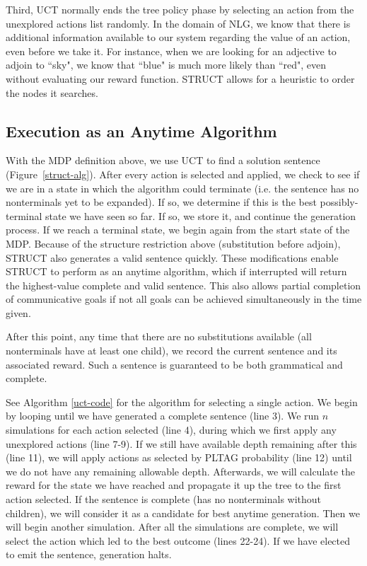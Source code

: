 Third, UCT normally ends the tree policy phase by selecting an action
from the unexplored actions list randomly.  In the domain of NLG,
we know that there is additional information available to our system
regarding the value of an action, even before we take it. For instance,
when we are looking for an adjective to adjoin to ``sky", we know that ``blue" is
much more likely than ``red", even without evaluating our reward function.
STRUCT allows for a heuristic to order the nodes
it searches.

\subsection{Execution as an Anytime Algorithm}
 With the MDP definition above, we use UCT to find a solution sentence
 (Figure~\ref{struct-alg}). After every action is
 selected and applied, we check to see if we are in a state in which
 the algorithm could terminate (i.e. the sentence has no nonterminals
 yet to be expanded).  If so, we determine if this is the best
 possibly-terminal state we have seen so far.  If so, we store it, and
 continue the generation process. If we reach a terminal state,
 we begin again from the start state of
 the MDP. Because of the structure restriction above (substitution
 before adjoin), STRUCT also generates a valid sentence quickly. These
 modifications enable STRUCT to perform as an anytime algorithm, which
 if interrupted will return the highest-value complete and valid
 sentence.  This also allows partial completion of communicative goals if
 not all goals can be achieved simultaneously in the time given.

After this point, any time that there are no substitutions
available (all nonterminals have at least one child), we record the
current sentence and its associated reward.  Such a sentence is
guaranteed to be both grammatical and complete.

See Algorithm \ref{uct-code} for the algorithm for selecting a single action.
We begin by looping until we have generated a complete sentence
(line 3).  We run $n$ simulations for each action selected (line 4),
during which we first apply any unexplored actions (line 7-9).  If
we still have available depth remaining after this (line 11), we will
apply actions as selected by PLTAG probability (line 12) until we
do not have any remaining allowable depth.  Afterwards, we will
calculate the reward for the state we have reached and propagate it
up the tree to the first action selected.  If the sentence is complete
(has no nonterminals without children), we will consider it as a candidate
for best anytime generation.  Then we will begin another
simulation.  After all the simulations are complete, we will select
the action which led to the best outcome (lines 22-24).  If we have
elected to emit the sentence, generation halts.

